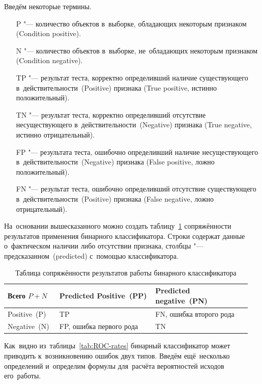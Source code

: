\documentclass[]{scrreprt}
\begin{document}
Введём некоторые термины.
\begin{itemize}
	\item[P "---] количество объектов в~выборке, обладающих некоторым признаком (\foreignlanguage{english}{Condition positive}).
	\item[N "---] количество объектов в~выборке, не~обладающих некоторым признаком (\foreignlanguage{english}{Condition negative}).
	\item[TP "---] результат теста, корректно определивший наличие существующего в~действительности~(\foreignlanguage{english}{Positive}) признака (\foreignlanguage{english}{True positive}, истинно положительный).
	\item[TN "---] результат теста, корректно определивший отсутствие несуществующего в~действительности~(\foreignlanguage{english}{Negative}) признака (\foreignlanguage{english}{True negative}, истинно отрицательный).
	\item[FP "---] результата теста, ошибочно определивший наличие несуществующего в~действительности~(\foreignlanguage{english}{Negative}) признака (\foreignlanguage{english}{False positive}, ложно положительный).
	\item[FN "---] результат теста, ошибочно определивший отсутствие существующего в~действительности~(\foreignlanguage{english}{Positive}) признака (\foreignlanguage{english}{False negative}, ложно отрицательный).
\end{itemize}
На~основании вышесказанного можно создать таблицу~\ref{tab:ROC-contingency-table} сопряжённости результатов применения бинарного классификатора. Строки содержат данные о~фактическом наличии либо отсутствии признака, столбцы "--- предсказанном~(\foreignlanguage{english}{predicted}) с~помощью классификатора.
%
\begin{table}[ht]
	\caption{Таблица сопряжённости результатов работы бинарного классификатора}  \label{tab:ROC-contingency-table}
	\centering
	\begin{tabularx}{\textwidth}{p{0.2\linewidth} p{0.375\linewidth} p{0.375\linewidth}} 
		\hline
		Всего $P+N$&Predicted Positive~(PP)&Predicted negative~(PN)\\
		\hline
		Positive~(P)&TP&FN, ошибка второго рода~\cite{Wiki:type-1-2-errors}\\
		\hline
		Negative~(N)&FP, ошибка первого рода~\cite{Wiki:type-1-2-errors}&TN\\
		\hline
	\end{tabularx}
\end{table}
%
Как~видно из~таблицы~\ref{tab:ROC-rates} бинарный классификатор может приводить к~возникновению ошибок двух типов. Введём ещё~несколько определений и~определим формулы для~расчёта вероятностей исходов его~работы.
\end{document}
